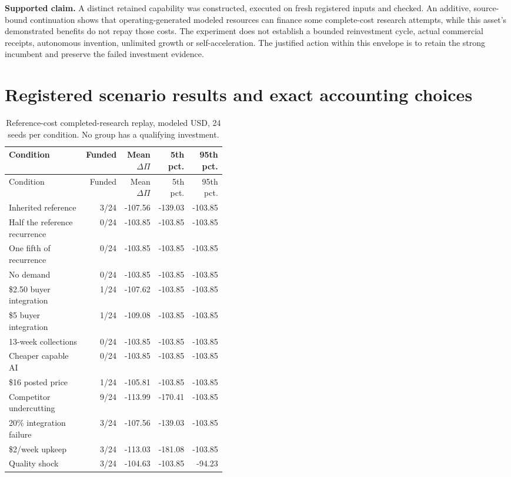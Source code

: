 \documentclass[11pt,letterpaper]{article}
\newcommand{\resultbox}[1]{\begin{center}\colorbox{AlphaMist}{\parbox{0.94\linewidth}{\vspace{5pt}#1\vspace{5pt}}}\end{center}}
\begin{document}
\resultbox{\textbf{Supported claim.} A distinct retained capability was constructed, executed on fresh registered inputs and checked. An additive, source-bound continuation shows that operating-generated modeled resources can finance some complete-cost research attempts, while this asset's demonstrated benefits do not repay those costs. The experiment does not establish a bounded reinvestment cycle, actual commercial receipts, autonomous invention, unlimited growth or self-acceleration. The justified action within this envelope is to retain the strong incumbent and preserve the failed investment evidence.}

\appendix
\section{Registered scenario results and exact accounting choices}

\begin{longtable}{@{}p{0.43\linewidth}rrrr@{}}
\caption{Reference-cost completed-research replay, modeled USD, 24 seeds per condition. No group has a qualifying investment.}\\
\toprule
Condition & Funded & Mean $\Delta\Pi$ & 5th pct. & 95th pct. \\
\midrule\endfirsthead
\toprule Condition & Funded & Mean $\Delta\Pi$ & 5th pct. & 95th pct. \\
\midrule\endhead
Inherited reference & 3/24 & -107.56 & -139.03 & -103.85 \\
Half the reference recurrence & 0/24 & -103.85 & -103.85 & -103.85 \\
One fifth of recurrence & 0/24 & -103.85 & -103.85 & -103.85 \\
No demand & 0/24 & -103.85 & -103.85 & -103.85 \\
\$2.50 buyer integration & 1/24 & -107.62 & -103.85 & -103.85 \\
\$5 buyer integration & 1/24 & -109.08 & -103.85 & -103.85 \\
13-week collections & 0/24 & -103.85 & -103.85 & -103.85 \\
Cheaper capable AI & 0/24 & -103.85 & -103.85 & -103.85 \\
\$16 posted price & 1/24 & -105.81 & -103.85 & -103.85 \\
Competitor undercutting & 9/24 & -113.99 & -170.41 & -103.85 \\
20\% integration failure & 3/24 & -107.56 & -139.03 & -103.85 \\
\$2/week upkeep & 3/24 & -113.03 & -181.08 & -103.85 \\
Quality shock & 3/24 & -104.63 & -103.85 & -94.23 \\
\bottomrule
\end{longtable}
\end{document}
